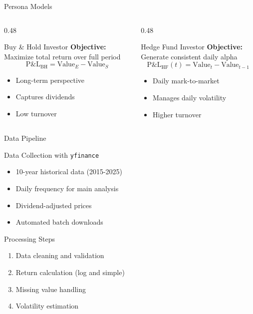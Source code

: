 \documentclass[12pt, aspectratio=43]{beamer}
\begin{document}
	\begin{frame}{Persona Models}
		\vspace{-5mm}
		\begin{columns}[T]
			\begin{column}{0.48\textwidth}
				\begin{block}{Buy \& Hold Investor}
					\textbf{Objective:} Maximize total return over full period
					\[
					\text{P\&L}_{\text{BH}} = \text{Value}_E - \text{Value}_S
					\]
					\begin{itemize}
						\item Long-term perspective
						\item Captures dividends
						\item Low turnover
					\end{itemize}
				\end{block}
			\end{column}
			\begin{column}{0.48\textwidth}
				\begin{block}{Hedge Fund Investor}
					\textbf{Objective:} Generate consistent daily alpha
					\[
					\text{P\&L}_{\text{HF}}(t) = \text{Value}_t - \text{Value}_{t-1}
					\]
					\begin{itemize}
						\item Daily mark-to-market
						\item Manages daily volatility
						\item Higher turnover
					\end{itemize}
				\end{block}
			\end{column}
		\end{columns}
	\end{frame}
	
	\begin{frame}{Data Pipeline}
		\begin{block}{Data Collection with \texttt{yfinance}}
			\begin{itemize}
				\item 10-year historical data (2015-2025)
				\item Daily frequency for main analysis
				\item Dividend-adjusted prices
				\item Automated batch downloads
			\end{itemize}
		\end{block}
		
		\begin{block}{Processing Steps}
			\begin{enumerate}
				\item Data cleaning and validation
				\item Return calculation (log and simple)
				\item Missing value handling
				\item Volatility estimation
			\end{enumerate}
		\end{block}
	\end{frame}
	
\end{document}

